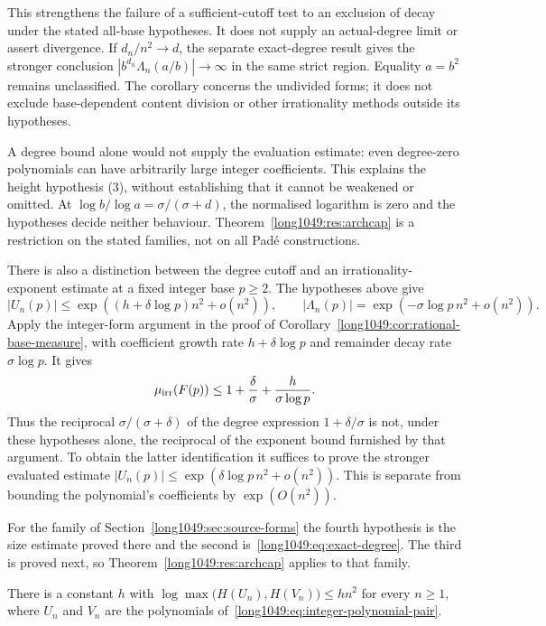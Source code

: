 This strengthens the failure of a sufficient-cutoff test to an exclusion
of decay under the stated all-base hypotheses.  It does not supply an
actual-degree limit or assert divergence.  If $d_n/n^2\to d$, the separate
exact-degree result gives the stronger conclusion
$|b^{d_n}\Lambda_n(a/b)|\to\infty$ in the same strict region.
Equality $a=b^2$ remains unclassified.  The corollary concerns the undivided
forms; it does not exclude base-dependent content division or other
irrationality methods outside its hypotheses.


\noindent A degree bound alone would not supply the evaluation
estimate: even degree-zero polynomials can have arbitrarily large
integer coefficients. This explains the height hypothesis (3),
without establishing that it cannot be weakened or omitted.
At $\log b/\log a=\sigma/(\sigma+d)$, the normalised logarithm
is zero and the hypotheses decide neither behaviour.
Theorem~\ref{long1049:res:archcap} is a restriction on the stated
families, not on all Pad\'e constructions.

There is also a distinction between the degree cutoff and an
irrationality-exponent estimate at a fixed integer base $p\ge2$.
The hypotheses above give
\[
 |U_n(p)|\le\exp((h+\delta\log p)n^2+o(n^2)),\qquad
 |\Lambda_n(p)|=\exp(-\sigma\log p\,n^2+o(n^2)).
\]
Apply the integer-form argument in the proof of
Corollary~\ref{long1049:cor:rational-base-measure}, with coefficient
growth rate $h+\delta\log p$ and remainder decay rate $\sigma\log p$.
It gives
\[
 \mu_{\rm irr}(F(p))\le
 1+\frac{\delta}{\sigma}+\frac{h}{\sigma\log p}.
\]
Thus the reciprocal $\sigma/(\sigma+\delta)$ of the degree expression
$1+\delta/\sigma$ is not, under these hypotheses alone, the reciprocal
of the exponent bound furnished by that argument. To obtain the latter
identification it suffices to prove the stronger evaluated estimate
$|U_n(p)|\le\exp(\delta\log p\,n^2+o(n^2))$. This is separate from
bounding the polynomial's coefficients by $\exp(O(n^2))$.

For the family of Section~\ref{long1049:sec:source-forms} the fourth hypothesis is the
size estimate proved there and the second is~\eqref{long1049:eq:exact-degree}.  The third
is proved next, so Theorem~\ref{long1049:res:archcap} applies to that family.

\begin{lemma}\label{long1049:res:sourceheight}
There is a constant $h$ with
$\log\max\bigl(H(U_n),H(V_n)\bigr)\le hn^{2}$ for every $n\ge1$, where $U_n$ and
$V_n$ are the polynomials of~\eqref{long1049:eq:integer-polynomial-pair}.
\end{lemma}

